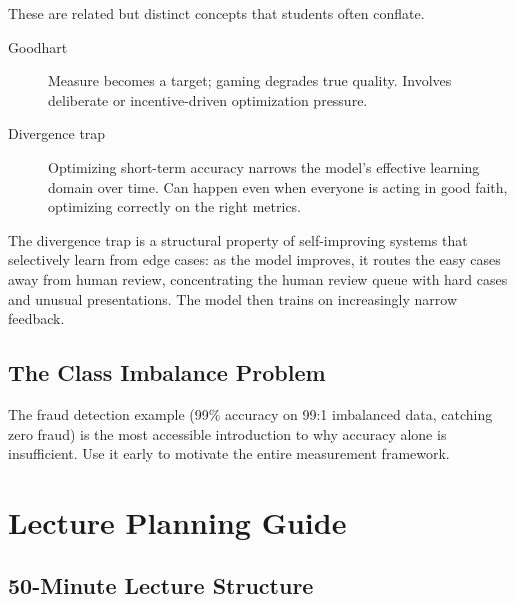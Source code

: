 These are related but distinct concepts that students often conflate.

\begin{description}
    \item[Goodhart] Measure becomes a target; gaming degrades true quality. Involves deliberate or incentive-driven optimization pressure.
    \item[Divergence trap] Optimizing short-term accuracy narrows the model's effective learning domain over time. Can happen even when everyone is acting in good faith, optimizing correctly on the right metrics.
\end{description}

The divergence trap is a structural property of self-improving systems that selectively learn from edge cases: as the model improves, it routes the easy cases away from human review, concentrating the human review queue with hard cases and unusual presentations. The model then trains on increasingly narrow feedback.

\subsection{The Class Imbalance Problem}

The fraud detection example (99\% accuracy on 99:1 imbalanced data, catching zero fraud) is the most accessible introduction to why accuracy alone is insufficient. Use it early to motivate the entire measurement framework.

\section{Lecture Planning Guide}

\subsection{50-Minute Lecture Structure}

